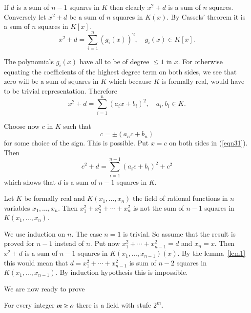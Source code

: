 \begin{Proof}
If $d$ is a sum of $n-1$ squares in $K$ then clearly $x^{2}+d$ is a
sum of $n$ squares. Conversely let $x^{2}+d$ be a sum of $n$ squares
in $K(x)$. By Cassels' theorem it is a sum of $n$ squares in $K[x]$.
$$
x^{2}+d=\sum\limits_{i=1}^{n}(g_i(x))^{2},\quad g_i(x)\in K[x].
$$

The polynomials $g_i(x)$ have all to be of degree $\leq 1$ in $x$. For
otherwise equating the coefficients of the highest degree term on both
sides, we see that zero will be a sum of squares in $K$ which because
$K$ is formally real, would have to be trivial
representation. Therefore
\begin{equation}\label{eqn31}
x^{2}+d=\sum\limits_{i=1}^{n}(a_ix+b_i)^{2},\quad a_i,b_i\in K.
\end{equation}

Choose now $c$ in $K$ such that 
$$
c=\pm(a_nc+b_n)
$$
for some choice of the sign. This is possible. Put $x=c$ on both sides
in (\ref{eqn31}). Then
$$
c^{2}+d=\sum\limits_{i=1}^{n-1}(a_ic+b_i)^{2}+c^{2}
$$
which shows that $d$ is a sum of $n-1$ squares in $K$.
\enprf
\end{Proof}


\begin{lem}\label{lem2}
Let $K$ be formally real and $K(x_1,\ldots,x_n)$ the field of rational
functions in $n$ variables $x_1,\ldots,x_n$. Then
$x^{2}_1+x^{2}_2+\cdots +x^{2}_n$ is not the sum of $n-1$ squares in $K(x_1,\ldots,x_n)$.
\end{lem}


\begin{Proof}
We use induction on $n$. The case $n=1$ is trivial. So assume that the
result is proved for $n-1$ instead of $n$. Put now $x^{2}_1+\cdots+
x^{2}_{n-1}=d$ and $x_n=x$. Then $x^{2}+d$ is a sum of $n-1$ squares
in $K(x_1,\ldots,x_{n-1})(x)$. By the lemma~\ref{lem1} this would mean that
$d=x^{2}_1+\cdots+x^{2}_{n-1}$ is sum of $n-2$ squares in
$K(x_1,\ldots,x_{n-1})$. By induction hypothesis this is impossible. 
\enprf
\end{Proof}

We are now ready to prove

\begin{thm}\label{thm9}
For every integer $m\geq o$ there is a field with stufe $2^{m}$.
\end{thm}


